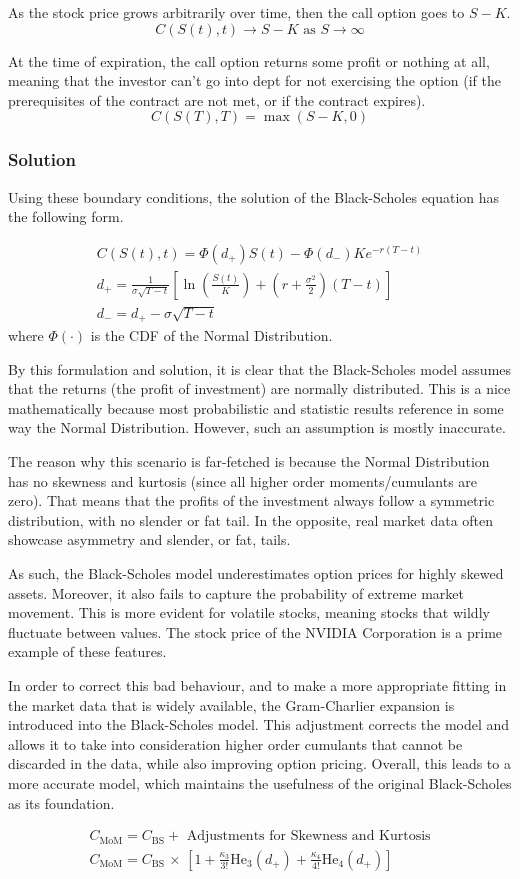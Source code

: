 As the stock price grows arbitrarily over time, then the call option goes to $S-K$.
\[
	C(S(t),t) \to S-K \text{ as } S \to \infty
\]

At the time of expiration, the call option returns some profit or nothing at all, meaning that the investor can't go into dept for not exercising the option (if the prerequisites of the contract are not met, or if the contract expires).
\[
	C(S(T), T) = \max(S-K, 0)
\]

\subsubsection{Solution}
Using these boundary conditions, the solution of the Black-Scholes equation has the following form.

\begin{gather*}
	C(S(t),t) = \Phi(d_{+})S(t) - \Phi(d_{-})Ke^{-r(T-t)} \\
	d_{+} = \frac{1}{\sigma \sqrt{ T - t}} \left[ \ln\left( \frac{S(t)}{K} \right) +\left( r+\frac{\sigma^2}{2} \right)(T-t) \right] \\	
	d_{-} = d_{+} - \sigma \sqrt{ T-t }
\end{gather*}
where $\Phi(\cdot)$ is the CDF of the Normal Distribution.

By this formulation and solution, it is clear that the Black-Scholes model assumes that the returns (the profit of investment) are normally distributed. This is a nice mathematically because most probabilistic and statistic results reference in some way the Normal Distribution. However, such an assumption is mostly inaccurate.

The reason why this scenario is far-fetched is because the Normal Distribution has no skewness and kurtosis (since all higher order moments/cumulants are zero). That means that the profits of the investment always follow a symmetric distribution, with no slender or fat tail. In the opposite, real market data often showcase asymmetry and slender, or fat, tails.

As such, the Black-Scholes model underestimates option prices for highly skewed assets. Moreover, it also fails to capture the probability of extreme market movement. This is more evident for volatile stocks, meaning stocks that wildly fluctuate between values. The stock price of the NVIDIA Corporation is a prime example of these features.

In order to correct this bad behaviour, and to make a more appropriate fitting in the market data that is widely available, the Gram-Charlier expansion is introduced into the Black-Scholes model. This adjustment corrects the model and allows it to take into consideration higher order cumulants that cannot be discarded in the data, while also improving option pricing. Overall, this leads to a more accurate model, which maintains the usefulness of the original Black-Scholes as its foundation.

\begin{gather*}
	C_{\text{MoM}} = C_{\text{BS}} + \text{ Adjustments for Skewness and Kurtosis} \\
	C_{\text{MoM}} = C_{\text{BS}} \, \times \, \left[ 1 + \frac{\kappa_{3}}{3!} \text{He}_{3}(d_{+}) + \frac{\kappa_{4}}{4!} \text{He}_{4}(d_{+}) \right]
\end{gather*}
